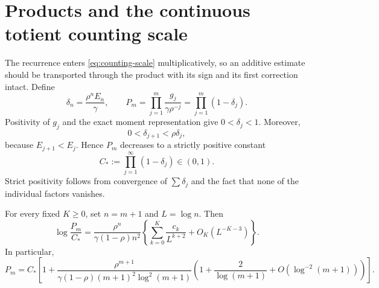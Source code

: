 \section{Products and the continuous totient counting scale}
\label{sec:products}

The recurrence enters \eqref{eq:counting-scale} multiplicatively, so
an additive estimate should be transported through the product with
its sign and its first correction intact. Define
\begin{equation}\label{eq:product-definitions}
 \delta_n=\frac{\rho^n E_n}{\gamma},\qquad
 P_m=\prod_{j=1}^m\frac{g_j}{\gamma\rho^{-j}}
     =\prod_{j=1}^m(1-\delta_j).
\end{equation}
Positivity of $g_j$ and the exact moment representation give
$0<\delta_j<1$. Moreover,
\begin{equation}\label{eq:delta-geometric}
 0<\delta_{j+1}<\rho\delta_j,
\end{equation}
because $E_{j+1}<E_j$. Hence $P_m$ decreases to a strictly positive
constant
\begin{equation}\label{eq:product-constant}
 C_*:=\prod_{j=1}^\infty(1-\delta_j)\in(0,1).
\end{equation}
Strict positivity follows from convergence of $\sum\delta_j$ and the
fact that none of the individual factors vanishes.

\begin{theorem}
\label{thm:product}
For every fixed $K\ge0$, set $n=m+1$ and $L=\log n$. Then
\begin{equation}\label{eq:product-asymptotic}
 \log\frac{P_m}{C_*}
 =\frac{\rho^n}{\gamma(1-\rho)n^2}
    \left\{\sum_{k=0}^K\frac{c_k}{L^{k+2}}
                     +O_K(L^{-K-3})\right\}.
\end{equation}
In particular,
\begin{equation}\label{eq:product-leading}
 P_m=C_*\left[1+
   \frac{\rho^{m+1}}{\gamma(1-\rho)(m+1)^2\log^2(m+1)}
       \left(1+\frac2{\log(m+1)}+O(\log^{-2}(m+1))\right)
        \right].
\end{equation}
\end{theorem}

